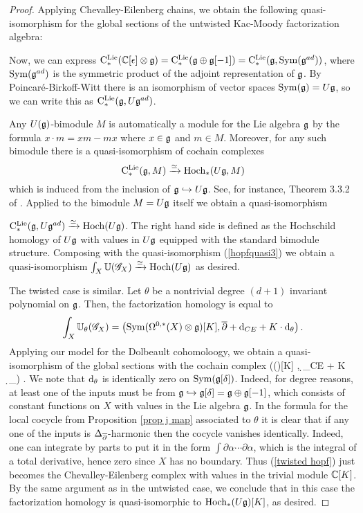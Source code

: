 \begin{proof}
Applying Chevalley-Eilenberg chains, we obtain the following quasi-isomorphism for the global sections of the untwisted Kac-Moody factorization algebra:
\beqn\label{hopfquasi3}
\eeqn
Now, we can express ${\rm C}^{\rm Lie}_*(\mathbb C[\epsilon] \otimes \mathfrak g) = {\rm C}^{\rm Lie}_*(\mathfrak g \oplus \mathfrak g[-1]) = {\rm C}^{\rm Lie}_*(\mathfrak g, {\rm Sym} (\mathfrak g^{ad}))$, where ${\rm Sym}(\mathfrak g^{ad})$ is the symmetric product of the adjoint representation of $\mathfrak g$. 
By Poincar\'{e}-Birkoff-Witt there is an isomorphism of vector spaces ${\rm Sym}(\mathfrak g) = U \mathfrak g$, so we can write this as ${\rm C}^{\rm Lie}_*(\mathfrak g, U \mathfrak g^{ad})$.

Any $U(\mathfrak g)$-bimodule $M$ is automatically a module for the Lie algebra $\mathfrak g$ by the formula $x \cdot m = xm - mx$ where $x \in \mathfrak g$ and $m \in M$.
Moreover, for any such bimodule there is a quasi-isomorphism of cochain complexes 
\[
{\rm C}^{\rm Lie}_*(\mathfrak g, M) \xrightarrow{\simeq} {\rm Hoch}_*(U\mathfrak g, M) 
\]
which is induced from the inclusion of $\mathfrak g \hookrightarrow U \mathfrak g$. 
See, for instance, Theorem 3.3.2 of \cite{LodayCyclic}.
Applied to the bimodule $M = U\mathfrak g$ itself we obtain a quasi-isomorphism 

\noindent${\rm C}^{\rm Lie}_*(\mathfrak g , U\mathfrak g^{ad}) \xrightarrow{\simeq} {\rm Hoch}(U\mathfrak g)$.
The right hand side is defined as the Hochschild homology of $U\mathfrak g$ with values in $U\mathfrak g$ equipped with the standard bimodule structure. 
Composing with the quasi-isomorphism (\ref{hopfquasi3}) we obtain a quasi-isomorphism $\int_X \mathbb U(\mathscr G_X) \xrightarrow{\simeq} {\rm Hoch}(U\mathfrak g)$ as desired.

The twisted case is similar. 
Let $\theta$ be a nontrivial degree $(d+1)$ invariant polynomial on $\mathfrak g$. 
Then, the factorization homology is equal to
\[
\int_X \mathbb U_\theta (\mathscr G_X) = \left({\rm Sym}(\Omega^{0,*}(X) \otimes \mathfrak g)[K] , \overline{\partial} + {\rm d}_{CE} + K \cdot {\rm d}_\theta\right) .
\]
Applying our model for the Dolbeault cohomoloogy, we obtain a quasi-isomorphism of the global sections with the cochain complex
\beqn\label{twisted hopf}
\left(\Sym(\fg[\delta])[K] ,  \d_{CE} + K \cdot \d_\theta \right) .
\eeqn
We note that ${\rm d}_\theta$ is identically zero on ${\rm Sym}(\mathfrak g[\delta])$. 
Indeed, for degree reasons, at least one of the inputs must be from $\mathfrak g \hookrightarrow \mathfrak g[\delta] = \mathfrak g \oplus \mathfrak g[-1]$, which consists of constant functions on $X$ with values in the Lie algebra $\mathfrak g$. 
In the formula for the local cocycle from Proposition \ref{prop j map} associated to $\theta$ it is clear that if any one of the inputs is $\Delta_{\overline{\partial}}$-harmonic then the cocycle vanishes identically. 
Indeed, one can integrate by parts to put it in the form $\int \partial \alpha \cdots \partial \alpha$, which is the integral of a total derivative, hence zero since $X$ has no boundary.
Thus (\ref{twisted hopf}) just becomes the Chevalley-Eilenberg complex with values in the trivial module $\mathbb C[K]$. 
By the same argument as in the untwisted case, we conclude that in this case the factorization homology is quasi-isomorphic to ${\rm Hoch}_*(U \mathfrak g)[K]$, as desired.
\end{proof}

